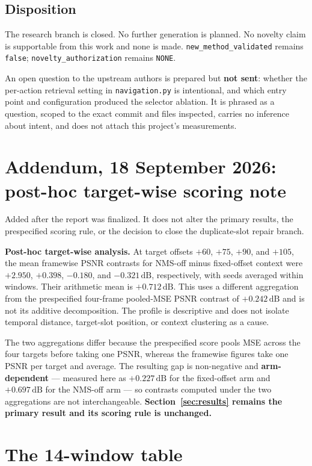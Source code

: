 \documentclass[11pt,a4paper]{article}
\newcommand{\code}[1]{\texttt{\small #1}}
\newcommand{\dB}{\,\mathrm{dB}}
\begin{document}
\subsection{Disposition}

The research branch is closed. No further generation is planned. No novelty claim is supportable from
this work and none is made. \code{new\_method\_validated} remains \code{false};
\code{novelty\_authorization} remains \code{NONE}.

An open question to the upstream authors is prepared but \textbf{not sent}: whether the per-action
retrieval setting in \code{navigation.py} is intentional, and which entry point and configuration
produced the selector ablation. It is phrased as a question, scoped to the exact commit and files
inspected, carries no inference about intent, and does not attach this project's measurements.

\section{Addendum, 18 September 2026: post-hoc target-wise scoring note}

Added after the report was finalized. It does not alter the primary results, the prespecified scoring
rule, or the decision to close the duplicate-slot repair branch.

\textbf{Post-hoc target-wise analysis.} At target offsets $+60$, $+75$, $+90$, and $+105$, the mean
framewise PSNR contrasts for NMS-off minus fixed-offset context were $+2.950$, $+0.398$, $-0.180$,
and $-0.321\dB$, respectively, with seeds averaged within windows. Their arithmetic mean is
$+0.712\dB$. This uses a different aggregation from the prespecified four-frame pooled-MSE PSNR
contrast of $+0.242\dB$ and is not its additive decomposition. The profile is descriptive and does
not isolate temporal distance, target-slot position, or context clustering as a cause.

The two aggregations differ because the prespecified score pools MSE across the four targets before
taking one PSNR, whereas the framewise figures take one PSNR per target and average. The resulting
gap is non-negative and \textbf{arm-dependent} --- measured here as $+0.227\dB$ for the fixed-offset
arm and $+0.697\dB$ for the NMS-off arm --- so contrasts computed under the two aggregations are not
interchangeable. \textbf{Section~\ref{sec:results} remains the primary result and its scoring rule is
unchanged.}

\appendix
\section{The 14-window table}
\label{app:windows}
\end{document}
